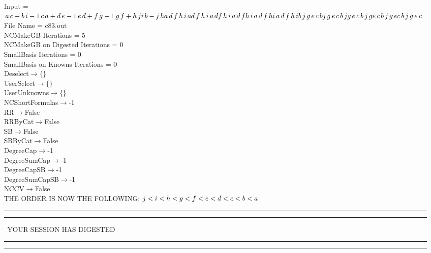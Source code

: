\documentclass[rep10,leqno]{report}
\begin{document}
\normalsize
\baselineskip=12pt
\noindent
Input = 
$
\\a\,
 c - b\,
 i\\
-1\,
 c\,
 a + d\,
 e\\
-1\,
 e\,
 d + f\,
 g\\
-1\,
 g\,
 f + h\,
 j\\
i\,
 b - j\,
 h\\
a\,
 d\,
 f\,
 h\,
 i\,
 a\\
d\,
 f\,
 h\,
 i\,
 a\,
 d\\
f\,
 h\,
 i\,
 a\,
 d\,
 f\\
h\,
 i\,
 a\,
 d\,
 f\,
 h\\
i\,
 a\,
 d\,
 f\,
 h\,
 i\\
b\,
 j\,
 g\,
 e\,
 c\,
 b\\
j\,
 g\,
 e\,
 c\,
 b\,
 j\\
g\,
 e\,
 c\,
 b\,
 j\,
 g\\
e\,
 c\,
 b\,
 j\,
 g\,
 e\\
c\,
 b\,
 j\,
 g\,
 e\,
 c\\
$
File Name = c83.out\\
NCMakeGB Iterations = 5\\
NCMakeGB on Digested Iterations = 0\\
SmallBasis Iterations = 0\\
SmallBasis on Knowns Iterations = 0\\
Deselect$\rightarrow \{\}$\\
UserSelect$\rightarrow \{\}$\\
UserUnknowns$\rightarrow \{\}$\\
NCShortFormulas$\rightarrow$-1\\
RR$\rightarrow $False\\
RRByCat$\rightarrow $False\\
SB$\rightarrow $False\\
SBByCat$\rightarrow $False\\
DegreeCap$\rightarrow $-1\\
DegreeSumCap$\rightarrow $-1\\
DegreeCapSB$\rightarrow $-1\\
DegreeSumCapSB$\rightarrow $-1\\
NCCV$\rightarrow $False\\
THE ORDER IS NOW THE FOLLOWING:\hfil\break
$
j<i<h<g<f<e<d<c<b<a\\
$
\rule[2pt]{6in}{4pt}\hfil\break
\rule[2pt]{1.879in}{4pt}
\ YOUR SESSION HAS DIGESTED\ 
\rule[2pt]{1.879in}{4pt}\hfil\break
\rule[2pt]{1.923in}{4pt}
\end{document}
